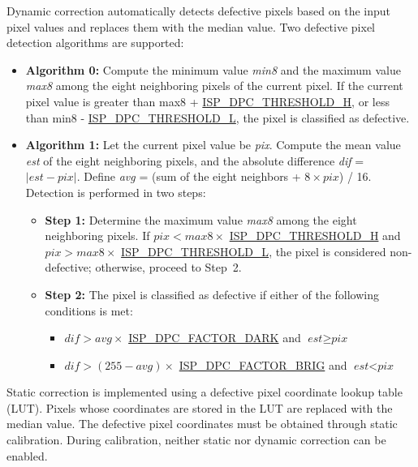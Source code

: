 \documentclass[main\_\_EN.tex]{subfiles}
\begin{document}
Dynamic correction automatically detects defective pixels based on the input pixel values and replaces them with the median value. Two defective pixel detection algorithms are supported:

\begin{itemize}
    \item \textbf{Algorithm 0:} Compute the minimum value \textit{min8} and the maximum value \textit{max8} among the eight neighboring pixels of the current pixel. If the current pixel value is greater than max8 + \hyperref[fielddesc:ISPDPCTHRESHOLDH]{ISP\_DPC\_THRESHOLD\_H}, or less than min8 - \hyperref[fielddesc:ISPDPCTHRESHOLDL]{ISP\_DPC\_THRESHOLD\_L}, the pixel is classified as defective.

    \item \textbf{Algorithm 1:} Let the current pixel value be \textit{pix}. Compute the mean value \textit{est} of the eight neighboring pixels, and the absolute difference \textit{dif} = $|\textit{est} - \textit{pix}|$. Define \textit{avg} = (sum of the eight neighbors + $8 \times \textit{pix}$) / 16. Detection is performed in two steps:
    \begin{itemize}
        \item \textbf{Step 1:} Determine the maximum value \textit{max8} among the eight neighboring pixels. If $\textit{pix} < \textit{max8} \times$ \hyperref[fielddesc:ISPDPCTHRESHOLDH]{ISP\_DPC\_THRESHOLD\_H} and $\textit{pix} > \textit{max8} \times$ \hyperref[fielddesc:ISPDPCTHRESHOLDL]{ISP\_DPC\_THRESHOLD\_L}, the pixel is considered non-defective; otherwise, proceed to Step~2.
        \item \textbf{Step 2:} The pixel is classified as defective if either of the following conditions is met:
        \begin{itemize}
            \item $\textit{dif} > \textit{avg} \times$ \hyperref[fielddesc:ISPDPCFACTORDARK]{ISP\_DPC\_FACTOR\_DARK} and $\textit{est} \ge \textit{pix}$
            \item $\textit{dif} > (255 - \textit{avg}) \times$ \hyperref[fielddesc:ISPDPCFACTORBRIG]{ISP\_DPC\_FACTOR\_BRIG} and $\textit{est} < \textit{pix}$
        \end{itemize}
    \end{itemize}
\end{itemize}

Static correction is implemented using a defective pixel coordinate lookup table (LUT). Pixels whose coordinates are stored in the LUT are replaced with the median value. The defective pixel coordinates must be obtained through static calibration. During calibration, neither static nor dynamic correction can be enabled.
\end{document}
